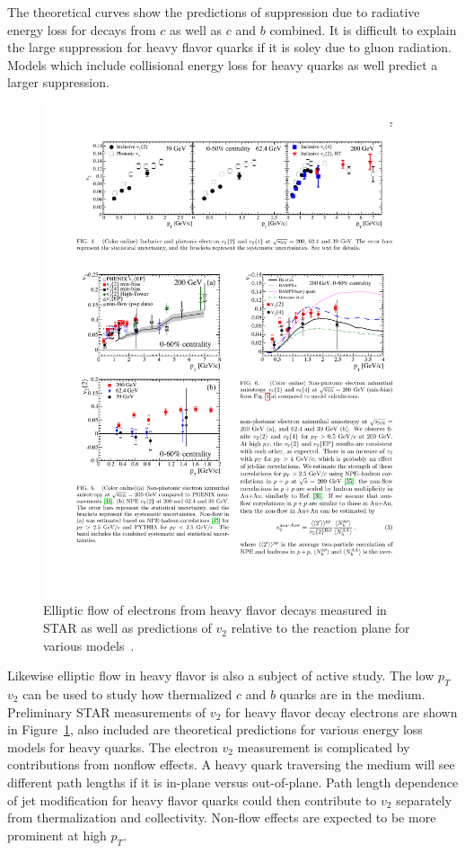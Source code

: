 The theoretical curves show the predictions of suppression due to radiative energy loss for decays from $c$ as well as $c$ and $b$ combined. It is difficult to explain the large suppression for heavy flavor quarks if it is soley due to gluon radiation. Models which include collisional energy loss for heavy quarks as well predict a larger suppression.

\begin{figure}[htbp]
\begin{center}
\includegraphics[scale=1.5]{Plots/Intro/npe_v2.pdf}
\end{center}
\caption[NPE $v_2$]{Elliptic flow of electrons from heavy flavor decays measured in STAR as well as predictions of $v_2$ relative to the reaction plane for various models~\cite{musNPEv2}.}
\label{fig:npe_v2_intro}
\end{figure}

Likewise elliptic flow in heavy flavor is also a subject of active study. The low $p_T$ $v_2$ can be used to study how thermalized $c$ and $b$ quarks are in the medium. Preliminary STAR measurements of $v_2$ for heavy flavor decay electrons are shown in Figure~\ref{fig:npe_v2_intro}, also included are theoretical predictions for various energy loss models for heavy quarks. The electron $v_2$ measurement is complicated by contributions from nonflow effects. A heavy quark traversing the medium will see different path lengths if it is in-plane versus out-of-plane. Path length dependence of jet modification for heavy flavor quarks could then contribute to $v_2$ separately from thermalization and collectivity. Non-flow effects are expected to be more prominent at high $p_T$.


